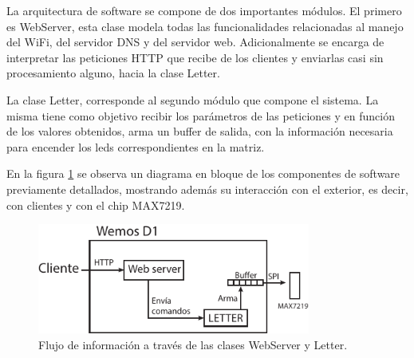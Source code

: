 

La arquitectura de software se compone de dos importantes módulos. El primero es \mbox{WebServer}, esta clase modela todas las funcionalidades relacionadas al manejo del WiFi, del servidor DNS y del servidor web. Adicionalmente se encarga de interpretar las peticiones HTTP que recibe de los clientes y enviarlas casi sin procesamiento alguno, hacia la clase Letter.

La clase Letter, corresponde al segundo módulo que compone el sistema. La misma tiene como objetivo recibir los parámetros de las peticiones y en función de los valores obtenidos, arma un buffer de salida, con la información necesaria para encender los leds correspondientes en la matriz.

En la figura \ref{fig:diagrama-bloque-sw} se observa un diagrama en bloque de los componentes de software previamente detallados, mostrando además su interacción con el exterior, es decir, con clientes y con el chip MAX7219.

\begin{figure}[ht!]
    \centering
    \begin{center}
        \includegraphics[width=0.8\textwidth]{imagenes/WemosD1-sistema.pdf}
        \caption{Flujo de información a través de las clases WebServer y Letter.}
        \label{fig:diagrama-bloque-sw}
    \end{center}
\end{figure}


